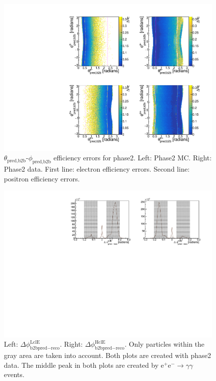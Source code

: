 \documentclass[a4paper,11pt,twosided,final,german,openbib,pdftex,listof=totoc,bibliography=totoc]{scrbook}
\begin{document}
\begin{appendix}
\begin{figure}[!htbp]
	\centering
	\includegraphics[width=\textwidth]{Plots/master/xCEffTP_MCData_Error.pdf}
	\caption[$\theta_{\textrm{pred,b2b}}$-$\phi_{\textrm{pred,b2b}}$ Efficiency Error Plots Phase2]{$\theta_{\textrm{pred,b2b}}$-$\phi_{\textrm{pred,b2b}}$ efficiency errors for phase2. Left: Phase2 MC. Right: Phase2 data. First line: electron efficiency errors. Second line: positron efficiency errors.}
	\label{plt:xCEff_Error}
\end{figure}



\begin{figure}[h!]
	\centering
	\includegraphics[width=\textwidth]{Plots/master/hb2b_Data.pdf}
	\caption[b2bClusterPhi - clusterPhi For Phase2 Data]{Left: $\Delta \phi _{\textrm{b2bpred} - \textrm{reco}}^{\textrm{LclE}}$. Right:  $\Delta \phi _{\textrm{b2bpred} - \textrm{reco}}^{\textrm{HclE}}$. Only particles within the gray area are taken into account. Both plots are created with phase2 data. The middle peak in both plots are created by $\textrm{e}^+\textrm{e}^- \rightarrow \gamma \gamma$ events.}
	\label{fig:b2bData2}
\end{figure}




\end{appendix}
\end{document}
